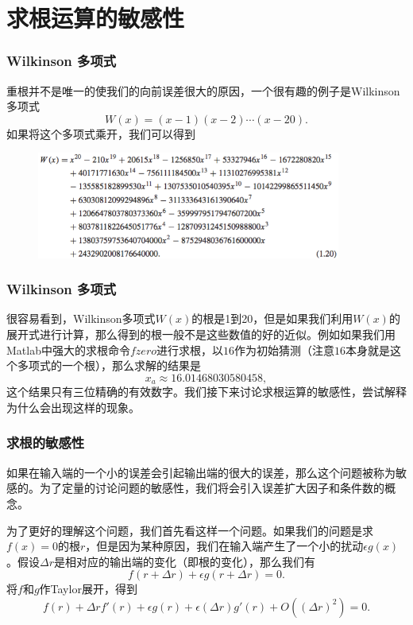 \documentclass[10pt]{beamer}
\begin{document}

\section{求根运算的敏感性}

\begin{frame}
\frametitle{Wilkinson 多项式}
重根并不是唯一的使我们的向前误差很大的原因，一个很有趣的例子是Wilkinson多项式
\begin{equation}
W(x) = (x-1)(x-2) \cdots (x-20).
\end{equation}
如果将这个多项式乘开，我们可以得到
\begin{figure}
\includegraphics[width=10cm]{figs/1-3-2_Wilkinson_Polynomial-1} 
\end{figure}
\end{frame}


\begin{frame}
\frametitle{Wilkinson 多项式}
很容易看到，Wilkinson多项式$W(x)$的根是1到20，但是如果我们利用$W(x)$的展开式进行计算，那么得到的根一般不是这些数值的好的近似。例如如果我们用Matlab中强大的求根命令$fzero$进行求根，以$16$作为初始猜测（注意$16$本身就是这个多项式的一个根），那么求解的结果是
\begin{equation}
x_a \approx 16.01468030580458,
\end{equation}
这个结果只有三位精确的有效数字。我们接下来讨论求根运算的敏感性，尝试解释为什么会出现这样的现象。
\end{frame}


\begin{frame}
\frametitle{求根的敏感性}
如果在输入端的一个小的误差会引起输出端的很大的误差，那么这个问题被称为敏感的。为了定量的讨论问题的敏感性，我们将会引入误差扩大因子和条件数的概念。

\vspace{0.2cm}
为了更好的理解这个问题，我们首先看这样一个问题。如果我们的问题是求$f(x) = 0$的根$r$，但是因为某种原因，我们在输入端产生了一个小的扰动$\epsilon g(x)$。假设$\Delta r$是相对应的输出端的变化（即根的变化），那么我们有
\begin{equation}
f(r + \Delta r) + \epsilon g(r+\Delta r) = 0.
\end{equation}
将$f$和$g$作Taylor展开，得到
\begin{equation}
f(r) + \Delta r f'(r) + \epsilon g(r) + \epsilon (\Delta r) g'(r) + O((\Delta r)^2)  = 0.
\end{equation}
\end{frame}
\end{document}
